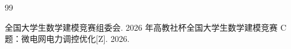 %
%
\clearpage
\begin{thebibliography}{99}

 全国大学生数学建模竞赛组委会. 2026 年高教社杯全国大学生数学建模竞赛 C 题：微电网电力调控优化[Z]. 2026.


\end{thebibliography}
